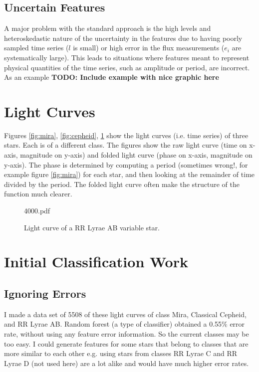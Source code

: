 \documentclass[11pt]{article}
\begin{document}
\subsection{Uncertain Features}
A major problem with the standard approach is the high levels and heteroskedastic nature of the uncertainty in the features due to having poorly sampled time series ($l$ is small) or high error in the flux measurements ($e_{i}$ are systematically large). This leads to situations where features meant to represent physical quantities of the time series, such as amplitude or period, are incorrect. As an example \textbf{TODO: Include example with nice graphic here}

\section{Light Curves}

Figures \ref{fig:mira}, \ref{fig:cepheid}, \ref{fig:rrlyrae} show the light curves (i.e. time series) of three stars. Each is of a different class. The figures show the raw light curve (time on x-axis, magnitude on y-axis) and folded light curve (phase on x-axis, magnitude on y-axis). The phase is determined by computing a period (sometimes wrong!, for example figure \ref{fig:mira}) for each star, and then looking at the remainder of time divided by the period. The folded light curve often make the structure of the function much clearer.





\begin{figure}[h]
  \begin{center}
    \begin{includegraphics}[scale=.5]{4000.pdf}
      \caption{Light curve of a RR Lyrae AB variable star.\label{fig:rrlyrae}}
    \end{includegraphics}
  \end{center}
\end{figure}



\section{Initial Classification Work}

\subsection{Ignoring Errors}
I made a data set of 5508 of these light curves of class Mira, Classical Cepheid, and RR Lyrae AB. Random forest (a type of classifier) obtained a 0.55\% error rate, without using any feature error information. So the current classes may be too easy. I could generate features for some stars that belong to classes that are more similar to each other e.g. using stars from classes RR Lyrae C and RR Lyrae D (not used here) are a lot alike and would have much higher error rates.
\end{document}

